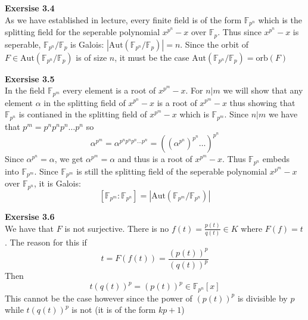 \documentclass[12pt]{article}
\newenvironment{ques}[1]{\textbf{Exersise #1}\vspace{1 mm}\\ }{\bigskip}
\theoremstyle{definition}
\newcommand{\F}{\mathbb F}
\renewcommand{\a}{\alpha}
\newcommand{\Aut}{\text{Aut}}
\begin{document}
\begin{ques}{3.4}
	As we have established in lecture, every finite field is of the form
	$\F_{p^n}$ which is the splitting field for the seperable polynomial
	$x^{p^n}-x$ over $\F_p$. Thus since $x^{p^n}-x$ is seperable,
	$\F_{p^n}/\F_p$ is Galois: $|\Aut(\F_{p^n}/\F_p)| = n$. Since the orbit of
	$F \in \Aut(\F_{p^n}/\F_p)$ is of size $n$, it must be the case
	$\Aut(\F_{p^n}/\F_p) = \text{orb}(F)$
\end{ques}

\begin{ques}{3.5}
	In the field $\F_{p^m}$ every element is a root of $x^{p^m} - x$. For $n|m$
	we will show that any element $\a$ in the splitting field of $x^{p^n} - x$
	is a root of $x^{p^m} - x$ thus showing that $\F_{p^n}$ is contianed in the
	splitting field of $x^{p^m} - x$ which is $\F_{p^m}$. Since $n|m$ we have
	that $p^m = p^np^np^n \dots p^n$ so 
	$$\a^{p^m} = \a^{p^np^np^n \dots p^n} = ((\a^{p^n})^{p^n} \dots )^{p^n}$$
	Since $\a^{p^n} = \a$, we get $\a^{p^m} = \a$ and thus is a root of
	$x^{p^m} - x$. Thus $\F_{p^n}$ embeds into $\F_{p^m}$. Since $\F_{p^m}$ is
	still the splitting field of the seperable polynomial $x^{p^m} - x$ over
	$\F_{p^n}$, it is Galois:
	$$[\F_{p^m} : \F_{p^n}] = |\Aut(\F_{p^m} / \F_{p^n})|$$
\end{ques}

\begin{ques}{3.6}
	We have that $F$ is not surjective. There is no $f(t) = \frac{p(t)}{q(t)}
	\in K$ where $F(f) = t$. The reason for this if
	$$t = F(f(t)) = \frac{(p(t))^p}{(q(t))^p}$$
	Then
	$$t(q(t))^p = (p(t))^p \in \F_{p^n}[x]$$
	This cannot be the case however since the power of $(p(t))^p$ is divisible
	by $p$ while $t(q(t))^p$ is not (it is of the form $kp + 1$)
\end{ques}
\end{document}
